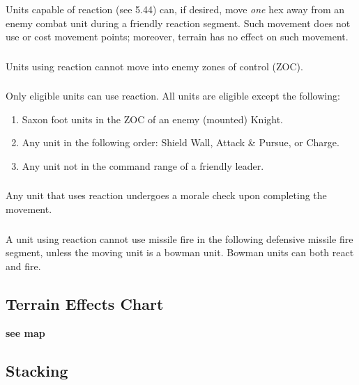 \subsubsection[How Reaction Works]{} Units capable of reaction (see 5.44) can, if desired, move \textit{one} hex away from an enemy combat unit during a friendly reaction segment. Such movement does not use or cost movement points; moreover, terrain has no effect on such movement.

\subsubsection[Reaction and ZOCs]{} Units using reaction cannot move into enemy zones of control (ZOC).

\subsubsection[Eligible Units]{} Only eligible units can use reaction. All units are eligible except the following:

\begin{enumerate}
  \item Saxon foot units in the ZOC of an enemy (mounted) Knight.
  \item Any unit in the following order: Shield Wall, Attack \& Pursue, or Charge.
  \item Any unit not in the command range of a friendly leader.
\end{enumerate}

\subsubsection[Morale Check]{} Any unit that uses reaction undergoes a morale check upon completing the movement.

\subsubsection[Missile Fire]{} A unit using reaction cannot use missile fire in the following defensive missile fire segment, unless the moving unit is a bowman unit. Bowman units can both react and fire.

\subsection{Terrain Effects Chart} \textbf{see map}

\subsection{Stacking}

